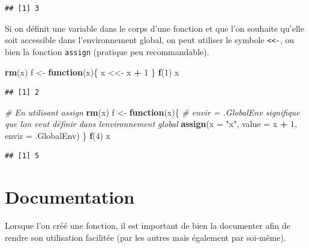 \documentclass[
  11pt,
]{book}
\newenvironment{Shaded}{\begin{snugshade}}{\end{snugshade}}
\newcommand{\CommentTok}[1]{\textcolor[rgb]{0.56,0.35,0.01}{\textit{#1}}}
\newcommand{\ControlFlowTok}[1]{\textcolor[rgb]{0.13,0.29,0.53}{\textbf{#1}}}
\newcommand{\DataTypeTok}[1]{\textcolor[rgb]{0.13,0.29,0.53}{#1}}
\newcommand{\DecValTok}[1]{\textcolor[rgb]{0.00,0.00,0.81}{#1}}
\newcommand{\KeywordTok}[1]{\textcolor[rgb]{0.13,0.29,0.53}{\textbf{#1}}}
\newcommand{\NormalTok}[1]{#1}
\newcommand{\OperatorTok}[1]{\textcolor[rgb]{0.81,0.36,0.00}{\textbf{#1}}}
\newcommand{\StringTok}[1]{\textcolor[rgb]{0.31,0.60,0.02}{#1}}
\numberwithin{equation}{section}
\numberwithin{countremarque}{section}
\begin{document}
\begin{lstlisting}
## [1] 3
\end{lstlisting}

Si on définit une variable dans le corps d'une fonction et que l'on souhaite qu'elle soit accessible dans l'environnement global, on peut utiliser le symbole \texttt{\textless{}\textless{}-}, ou bien la fonction \texttt{assign} (pratique peu recommandable).

\begin{Shaded}
\begin{Highlighting}[]
\KeywordTok{rm}\NormalTok{(x)}
\NormalTok{f \textless{}{-}}\StringTok{ }\ControlFlowTok{function}\NormalTok{(x)\{}
\NormalTok{  x \textless{}\textless{}{-}}\StringTok{ }\NormalTok{x }\OperatorTok{+}\StringTok{ }\DecValTok{1}
\NormalTok{\}}
\KeywordTok{f}\NormalTok{(}\DecValTok{1}\NormalTok{)}
\NormalTok{x}
\end{Highlighting}
\end{Shaded}

\begin{lstlisting}
## [1] 2
\end{lstlisting}

\begin{Shaded}
\begin{Highlighting}[]
\CommentTok{\# En utilisant assign}
\KeywordTok{rm}\NormalTok{(x)}
\NormalTok{f \textless{}{-}}\StringTok{ }\ControlFlowTok{function}\NormalTok{(x)\{}
  \CommentTok{\# envir = .GlobalEnv signifique que l\textquotesingle{}on veut définir dans l\textquotesingle{}environnement global}
  \KeywordTok{assign}\NormalTok{(}\DataTypeTok{x =} \StringTok{"x"}\NormalTok{, }\DataTypeTok{value =}\NormalTok{ x }\OperatorTok{+}\StringTok{ }\DecValTok{1}\NormalTok{, }\DataTypeTok{envir =}\NormalTok{ .GlobalEnv)}
\NormalTok{\}}
\KeywordTok{f}\NormalTok{(}\DecValTok{4}\NormalTok{)}
\NormalTok{x}
\end{Highlighting}
\end{Shaded}

\begin{lstlisting}
## [1] 5
\end{lstlisting}

\hypertarget{documentation}{%
\section{Documentation}\label{documentation}}

Lorsque l'on créé une fonction, il est important de bien la documenter afin de rendre son utilisation facilitée (par les autres mais également par soi-même).
\end{document}
